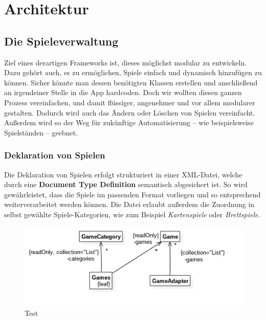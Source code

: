 \chapter{Architektur}

\section{Die Spieleverwaltung}
\sectionauthor{\frank}

Ziel eines derartigen Frameworks ist, dieses möglichst modular  zu entwickeln. Dazu gehört auch, es zu ermöglichen, Spiele einfach
und dynamisch hinzufügen zu können. Sicher könnte man dessen benötigten Klassen
erstellen und anschließend an irgendeiner Stelle in die App hardcoden. Doch wir
wollten diesen ganzen Prozess vereinfachen, und damit flüssiger, angenehmer und
vor allem modularer gestalten. Dadurch wird auch das Ändern oder Löschen von
Spielen vereinfacht. Außerdem wird so der Weg für zukünftige Automatisierung --
wie beispielsweise Spielständen -- geebnet.

\subsection{Deklaration von Spielen}

Die Deklaration von Spielen erfolgt strukturiert in einer XML-Datei, welche
durch eine \textbf{Document Type Definition} semantisch abgesichert ist. So
wird gewährleistet, dass die Spiele im passenden Format vorliegen und so
entsprechend weiterverarbeitet werden können. Die Datei erlaubt außerdem die
Zuordnung in selbst gewählte Spiele-Kategorien, wie zum Beispiel
\emph{Kartenspiele} oder \emph{Brettspiele}.

\begin{figure}[h]
	\centering
	\includegraphics{resources/gamemanager/gamemanager_uml}
	\caption{Test}
	\label{fig:gm_uml}
\end{figure}


